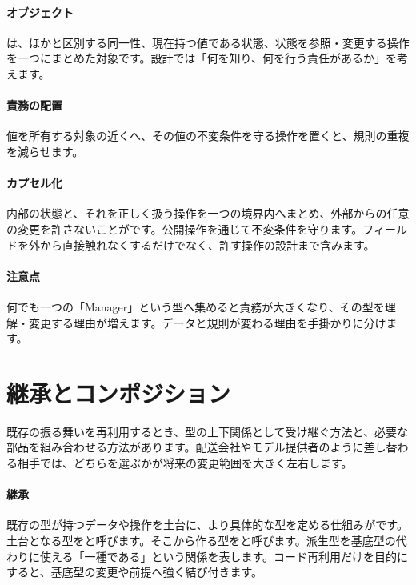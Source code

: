 \begingroup
\begingroup
\paragraph{オブジェクト}
        は、ほかと区別する同一性、現在持つ値である状態、状態を参照・変更する操作を一つにまとめた対象です。設計では「何を知り、何を行う責任があるか」を考えます。

\paragraph{責務の配置}
        値を所有する対象の近くへ、その値の不変条件を守る操作を置くと、規則の重複を減らせます。

\par
\endgroup
\medskip
\begingroup
\paragraph{カプセル化}
        内部の状態と、それを正しく扱う操作を一つの境界内へまとめ、外部からの任意の変更を許さないことがです。公開操作を通じて不変条件を守ります。フィールドを外から直接触れなくするだけでなく、許す操作の設計まで含みます。

\paragraph{注意点}
        何でも一つの「Manager」という型へ集めると責務が大きくなり、その型を理解・変更する理由が増えます。データと規則が変わる理由を手掛かりに分けます。

\par
\endgroup
\par
\endgroup


\section{継承とコンポジション}
\label{sec:04-software-engineering-13}

既存の振る舞いを再利用するとき、型の上下関係として受け継ぐ方法と、必要な部品を組み合わせる方法があります。配送会社やモデル提供者のように差し替わる相手では、どちらを選ぶかが将来の変更範囲を大きく左右します。

\begingroup
\begingroup
\paragraph{継承}
        既存の型が持つデータや操作を土台に、より具体的な型を定める仕組みがです。土台となる型をと呼びます。そこから作る型をと呼びます。派生型を基底型の代わりに使える「一種である」という関係を表します。コード再利用だけを目的にすると、基底型の変更や前提へ強く結び付きます。

